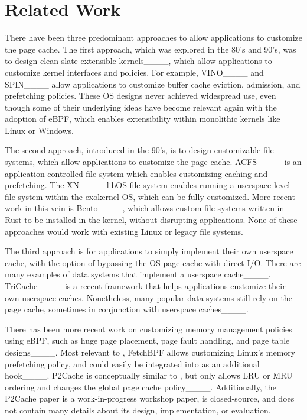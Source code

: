 \section{Related Work}
\label{sec:related}






There have been three predominant approaches to allow applications to customize the page cache. 
The first approach, which was explored in the 80's and 90's, was to design clean-slate extensible kernels____, which allow applications to customize kernel interfaces and policies. For example, VINO____ and SPIN____ %
allow applications to customize buffer cache eviction, admission, and prefetching policies. These OS designs never achieved widespread use, even though some of their underlying ideas have become relevant again with the adoption of eBPF, which enables extensibility within monolithic kernels like Linux or Windows.

The second approach, introduced in the 90's, is to design customizable file systems, which allow applications to customize the page cache. ACFS____ is an application-controlled file system which enables customizing caching and prefetching. The XN____ libOS file system enables running a userspace-level file system within the exokernel OS, which can be fully customized. More recent work in this vein is Bento____, which allows custom file systems written in Rust to be installed in the kernel, without disrupting applications. None of these approaches would work with existing Linux or legacy file systems. %

The third approach is for applications to simply implement their own userspace cache, with the option of bypassing the OS page cache with direct I/O. There are many examples of data systems that implement a userspace cache____. TriCache____ is a recent framework that helps applications customize their own userspace caches. Nonetheless, many popular data systems still rely on the page cache, sometimes in conjunction with userspace caches____. %

There has been more recent work on customizing memory management policies using eBPF, such as huge page placement, page fault handling, and page table designs____. Most relevant to \name, FetchBPF allows customizing Linux's memory prefetching policy, and could easily be integrated into \name as an additional hook____. P2Cache is conceptually similar to \name, but only allows LRU or MRU ordering and changes the global page cache policy____. Additionally, the P2Cache paper is a work-in-progress workshop paper, is closed-source, and does not contain many details about its design, implementation, or evaluation.